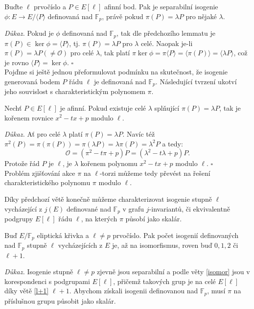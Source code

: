 \documentclass[12pt]{report}
\begin{document}
\begin{dusledek}
Buďte $\ell$ prvočíslo a $P \in E[\ell]$ afinní bod. Pak je separabilní isogenie $\phi : E \longrightarrow E/\langle P \rangle$ definovaná nad $\mathbb{F}_p$, právě pokud $\pi (P) = \lambda P$ pro nějaké $\lambda$.
\end{dusledek}
\noindent \textit{Důkaz.} Pokud je $\phi$ definovaná nad $\mathbb{F}_p$, tak dle předchozího lemmatu je $\pi (P) \in \ker \phi = \langle P \rangle$, tj. $\pi (P) = \lambda P$ pro $\lambda$ celé. Naopak je-li $\pi(P) = \lambda P (\neq \mathcal{O})$ pro celé $\lambda$, tak platí $\pi \ker \phi = \pi \langle P \rangle = \langle \pi( P) \rangle = \langle \lambda P \rangle$, což je rovno $\langle P \rangle = \ker \phi$. \hfill $\square$\\

Pojďme si ještě jednou přeformulovat podmínku na skutečnost, že isogenie generovaná bodem $P$ řádu $\ell$ je definovaná nad $\mathbb{F}_p$. Následující tvrzení ukotví jeho souvislost s charakteristickým polynomem $\pi$.

\begin{lemma}
Nechť $P \in E[\ell]$ je afinní. Pokud existuje celé $\lambda$ splňující $\pi (P) = \lambda P$, tak je kořenem rovnice $x^2 - tx + p$ modulo $\ell$. 
\end{lemma}
\noindent \textit{Důkaz.} Ať pro celé $\lambda$ platí $\pi(P) = \lambda P$. Navíc též $\pi^2 (P) = \pi(\pi (P)) = \pi(\lambda P) = \lambda \pi(P) = \lambda^2 P$ a tedy:
\begin{equation*}
\mathcal{O} = (\pi^2 - t \pi + p)P = (\lambda ^ 2 - t \lambda + p)P.
\end{equation*}
Protože řád $P$ je $\ell$, je $\lambda$ kořenem polynomu $x^2 - tx + p$ modulo $\ell$. \hfill $\square$\\


Problém zjišťování akce $\pi$ na $\ell$-torzi můžeme tedy převést na řešení charakteristického polynomu $\pi$ modulo $\ell$. 

Díky předchozí větě konečně můžeme charakterizovat isogenie stupně $\ell$ vycházející z $j(E)$ definované nad $\mathbb{F}_p$ v grafu $j$-invariantů, či ekvivalentně podgrupy $E[\ell]$ řádu $\ell$, na kterých $\pi$ působí jako skalár.

\begin{veta}
Buď $E/\mathbb{F}_p$ eliptická křivka a $\ell \neq p$ prvočíslo. Pak počet isogenií definovaných nad $\mathbb{F}_p$ stupně $\ell$ vycházejících z $E$ je, až na isomorfismus, roven buď $0,1,2$ či $\ell+1$. 
\end{veta}
\noindent \textit{Důkaz.} Isogenie stupně $\ell \neq p$ zjevně jsou separabilní a podle věty \ref{isomor} jsou v korespondenci s podgrupami $E[\ell]$, přičemž takových grup je na celé $E[\ell]$ díky větě \ref{l+1} $\ell+1$. Abychom získali isogenii definovanou nad $\mathbb{F}_p$, musí $\pi$ na příslušnou grupu působit jako skalár. 
\end{document}
